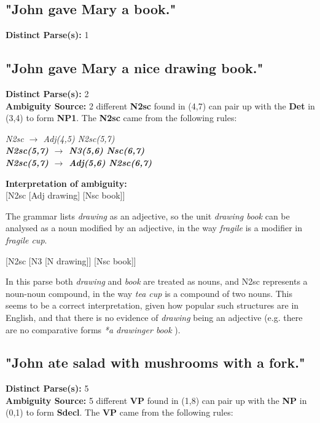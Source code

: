 \documentclass{article}
\begin{document}
\subsection{"John gave Mary a book."}

\textbf{Distinct Parse(s):} 1

\subsection{"John gave Mary a nice drawing book."}

\textbf{Distinct Parse(s):} 2\\

\textbf{Ambiguity Source:} 2 different \textbf{N2sc} found in (4,7) can pair up with the \textbf{Det} in (3,4) to form \textbf{NP1}. The \textbf{N2sc} came from the following rules:

\begin{center}
\emph{N2sc $\rightarrow$ Adj(4,5) N2sc(5,7)}\\
\textbf{\emph{N2sc(5,7) $\rightarrow$ N3(5,6) Nsc(6,7)}\\
\emph{N2sc(5,7) $\rightarrow$ Adj(5,6) N2sc(6,7)}}
\end{center}

\textbf{Interpretation of ambiguity:}\\
{[}N2sc {[}Adj drawing{]} {[}Nsc book{]}{]}

The grammar lists \emph{drawing} as an adjective, so the unit \emph{drawing book} can be analysed as a noun modified by an adjective, in the way \emph{fragile} is a modifier in \emph{fragile cup}.

{[}N2sc {[}N3 {[}N drawing{]}{]} {[}Nsc book{]}{]}

In this parse both \emph{drawing} and \emph{book} are treated as nouns, and N2sc represents a noun-noun compound, in the way \emph{tea cup} is a compound of two nouns. This seems to be a correct interpretation, given how popular such structures are in English, and that there is no evidence of \emph{drawing} being an adjective (e.g. there are no comparative forms \emph{*a drawinger book }).

\subsection{"John ate salad with mushrooms with a fork."}

\textbf{Distinct Parse(s):} 5\\

\textbf{Ambiguity Source:} 5 different \textbf{VP} found in (1,8) can pair up with the \textbf{NP} in (0,1) to form \textbf{Sdecl}. The \textbf{VP} came from the following rules:
\end{document}
